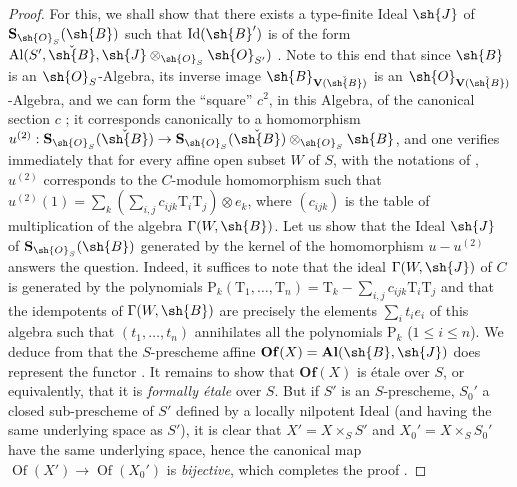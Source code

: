 \begin{proof}
For this, we shall show that there exists a type-finite Ideal $\sh{J}$ of $\mathbf{S}_{\sh{O}_S}(\sh{B})$ such that $\operatorname{Id}(\sh{B}')$ is of the form $\mathrm{Al}(S',\check{\sh{B}},\sh{J}\otimes_{\sh{O}_S}\sh{O}_{S'})$ .
Note to this end that since $\sh{B}$ is an $\sh{O}_S$-Algebra, its inverse image $\sh{B}_{\mathbf{V}(\check{\sh{B}})}$ is an $\sh{O}_{\mathbf{V}(\check{\sh{B}})}$-Algebra, and we can form the ``square'' $c^2$, in this Algebra, of the canonical section $c$ ;
it corresponds canonically to a homomorphism $u^{(2)}:\mathbf{S}_{\sh{O}_S}(\check{\sh{B}})\to\mathbf{S}_{\sh{O}_S}(\check{\sh{B}})\otimes_{\sh{O}_S}\sh{B}$, and one verifies immediately that for every affine open subset $W$ of $S$, with the notations of , $u^{(2)}$ corresponds to the $C$-module homomorphism such that $u^{(2)}(1)=\sum_k(\sum_{i,j}c_{ijk}\mathrm{T}_i\mathrm{T}_j)\otimes e_k$, where $(c_{ijk})$ is the table of multiplication of the algebra $\Gamma(W,\sh{B})$.
Let us show that the Ideal $\sh{J}$ of $\mathbf{S}_{\sh{O}_S}(\sh{B})$ generated by the kernel of the homomorphism $u-u^{(2)}$ answers the question.
Indeed, it suffices to note that the ideal $\Gamma(W,\sh{J})$ of $C$ is generated by the polynomials $\mathrm{P}_k(\mathrm{T}_1,\ldots,\mathrm{T}_n)=\mathrm{T}_k-\sum_{i,j}c_{ijk}\mathrm{T}_i\mathrm{T}_j$ and that the idempotents of $\Gamma(W,\sh{B})$ are precisely the elements $\sum_i t_i e_i$ of this algebra such that $(t_1,\ldots,t_n)$ annihilates all the polynomials $\mathrm{P}_k$ ($1\leq i\leq n$).
We deduce from  that the $S$-prescheme affine $\mathbf{Of}(X)=\mathbf{Al}(\sh{B},\sh{J})$ does represent the functor .
It remains to show that $\mathbf{Of}(X)$ is \'etale over $S$, or equivalently, that it is \emph{formally \'etale} over $S$.
But if $S'$ is an $S$-prescheme, $S_0'$ a closed sub-prescheme of $S'$ defined by a locally nilpotent Ideal (and having the same underlying space as $S'$), it is clear that $X'=X\times_S S'$ and $X_0'=X\times_S S_0'$ have the same underlying space, hence the canonical map $\operatorname{Of}(X')\to\operatorname{Of}(X_0')$ is \emph{bijective}, which completes the proof .
\end{proof}

